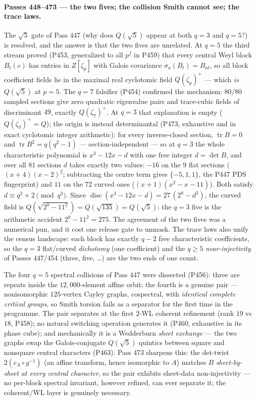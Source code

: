 \documentclass[12pt,a4paper]{article}
\def\mathbb#1{#1}%
\def\mathbf#1{#1}%
\def\textbf#1{#1}%
\def\cdot{ }%
\theoremstyle{definition}
\newcommand{\ZZ}{\mathbb{Z}}
\begin{document}
\paragraph{Passes 448--473 --- the two fives; the collision Smith cannot see;
the trace laws.}
The $\sqrt5$ gate of Pass 447 (why does $\mathbf Q(\sqrt5)$ appear at both
$q=3$ and $q=5$?) is resolved, and the answer is that \textbf{the two fives
are unrelated}.  At $q=5$ the third stream proved (P453, generalized to all
$p^f$ in P459) that every central Weyl block $B_t(c)$ has entries in
$\ZZ[\zeta_p]$ with Galois covariance $\sigma_a(B_t)=B_{at}$, so all block
coefficient fields lie in the maximal real cyclotomic field
$\mathbf Q(\zeta_p)^+$ --- which \emph{is} $\mathbf Q(\sqrt5)$ at $p=5$.  The
$q=7$ falsifier (P454) confirmed the mechanism: $80/80$ sampled sections give
zero quadratic eigenvalue pairs and trace-cubic fields of discriminant $49$,
exactly $\mathbf Q(\zeta_7)^+$.  At $q=3$ that explanation is empty
($\mathbf Q(\zeta_3)^+=\mathbf Q$); the origin is instead
\textbf{determinantal} (P473, exhaustive and in exact cyclotomic integer
arithmetic): for every inverse-closed section, $\operatorname{tr}B=0$ and
$\operatorname{tr}B^2=q(q^2{-}1)$ --- section-independent --- so at $q=3$ the
whole characteristic polynomial is $x^3-12x-d$ with one free integer
$d=\det B$, and over all $81$ sections $d$ takes exactly two values: $-16$ on
the $9$ flat sections ($(x{+}4)(x{-}2)^2$; subtracting the centre term gives
$\{-5,1,1\}$, the P447 PDS fingerprint) and $11$ on the $72$ curved ones
($(x{+}1)(x^2{-}x{-}11)$).  Both satisfy $d\equiv q^2{+}2 \pmod{q^3}$.  Since
$\operatorname{disc}(x^3{-}12x{-}d)=27\,(2^8-d^2)$, the curved field is
$\mathbf Q(\sqrt{2^8-11^2})=\mathbf Q(\sqrt{135})=\mathbf Q(\sqrt5)$: the
$q=3$ five is the arithmetic accident $2^8-11^2=27\cdot5$.  The agreement of
the two fives was a numerical pun, and it cost one release gate to unmask.
The trace laws also unify the census landscape: each block has exactly $q-2$
free characteristic coefficients, so the $q=3$ flat/curved \emph{dichotomy}
(one coefficient) and the $q\ge5$ \emph{near-injectivity} of Passes 447/454
(three, five, \dots) are the two ends of one count.

The four $q=5$ spectral collisions of Pass 447 were dissected (P456): three
are repeats inside the $12{,}000$-element affine orbit; the fourth is a
\textbf{genuine pair} --- nonisomorphic $125$-vertex Cayley graphs, cospectral,
with \emph{identical complete critical groups}, so Smith torsion fails as a
separator for the first time in the programme.  The pair separates at the
first $2$-WL coherent refinement (rank $19$ vs $18$, P458); no natural
switching operation generates it (P460, exhaustive in its phase cube); and
mechanically it is a Wedderburn \emph{sheet exchange} --- the two graphs swap
the Galois-conjugate $\mathbf Q(\sqrt5)$ quintics between square and
nonsquare central characters (P463).  Pass 473 sharpens this: the det-twist
$2\cdot(c_A\circ g^{-1})$ (an affine transform, hence isomorphic to $A$)
matches $B$ \emph{sheet-by-sheet at every central character}, so the pair
exhibits \textbf{sheet-data non-injectivity} --- no per-block spectral
invariant, however refined, can ever separate it; the coherent/WL layer is
genuinely necessary.
\end{document}
